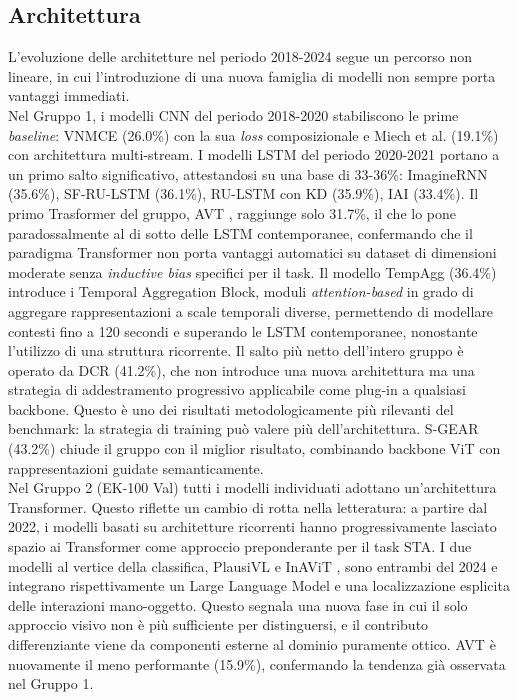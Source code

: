 \subsection{Architettura}
L'evoluzione delle architetture nel periodo 2018-2024 segue un percorso non lineare, in cui l'introduzione di una nuova famiglia di modelli non sempre porta vantaggi immediati. \\
Nel Gruppo 1, i modelli CNN del periodo 2018-2020 stabiliscono le prime \textit{baseline}: VNMCE \cite{furnari2018leveraging} (26.0\%) con la sua \textit{loss} composizionale e Miech et al. \cite{miech2019leveraging} (19.1\%) con architettura multi-stream. I modelli LSTM del periodo 2020-2021 portano a un primo salto significativo, attestandosi su una base di 33-36\%: ImagineRNN \cite{wu2020learning} (35.6\%), SF-RU-LSTM \cite{osman2021slowfast} (36.1\%), RU-LSTM con KD \cite{camporese2021knowledge} (35.9\%), IAI \cite{zhang2020egocentric} (33.4\%). Il primo Trasformer del gruppo, AVT \cite{girdhar2021anticipative}, raggiunge solo 31.7\%, il che lo pone paradossalmente al di sotto delle LSTM contemporanee, confermando che il paradigma Transformer non porta vantaggi automatici su dataset di dimensioni moderate senza \textit{inductive bias} specifici per il task. Il modello TempAgg \cite{sener2021technical, sener2020temporal} (36.4\%) introduce i Temporal Aggregation Block, moduli\textit{ attention-based} in grado di aggregare rappresentazioni a scale temporali diverse, permettendo di modellare contesti fino a 120 secondi e superando le LSTM contemporanee, nonostante l'utilizzo di una struttura ricorrente.  Il salto più netto dell'intero gruppo è operato da DCR \cite{xu2022learning}(41.2\%), che non introduce una nuova architettura ma una strategia di addestramento progressivo applicabile come plug-in a qualsiasi backbone. Questo è uno dei risultati metodologicamente più rilevanti del benchmark: la strategia di training può valere più dell'architettura. S-GEAR \cite{diko2024semantically} (43.2\%) chiude il gruppo con il miglior risultato, combinando backbone ViT con rappresentazioni guidate semanticamente. \\
Nel Gruppo 2 (EK-100 Val) tutti i modelli individuati adottano un'architettura Transformer. Questo riflette un cambio di rotta nella letteratura: a partire dal 2022, i modelli basati su architetture ricorrenti hanno progressivamente lasciato spazio ai Transformer come approccio preponderante per il task STA. I due modelli al vertice della classifica, PlausiVL \cite{mittal2024can} e InAViT \cite{roy2024interaction}, sono entrambi del 2024 e integrano rispettivamente un Large Language Model e una localizzazione esplicita delle interazioni mano-oggetto. Questo segnala una nuova fase in cui il solo approccio visivo non è più sufficiente per distinguersi, e il contributo differenziante viene da componenti esterne al dominio puramente ottico. AVT \cite{girdhar2021anticipative} è nuovamente il meno performante (15.9\%), confermando la tendenza già osservata nel Gruppo 1. \\
